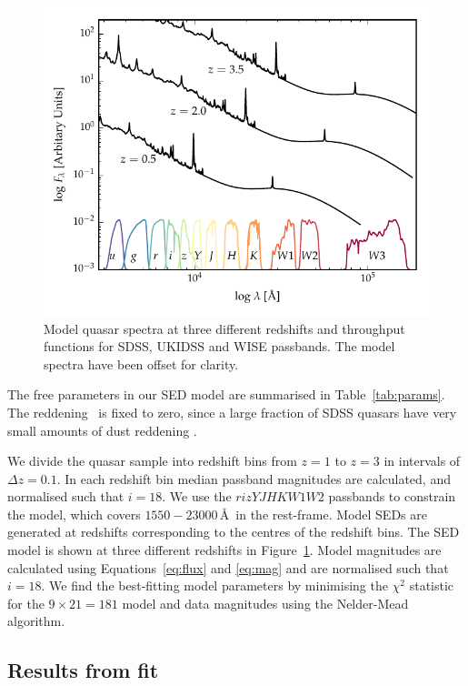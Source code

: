 \begin{figure}
  \centering
  \includegraphics[width=\textwidth]{figures/chapter05/throughput.pdf}
  \caption[{Model quasar spectrum at three different redshifts.}]{Model quasar spectra at three different redshifts and throughput functions for SDSS, UKIDSS and WISE passbands. The model spectra have been offset for clarity.}
  \label{fig:filters}
\end{figure}

The free parameters in our SED model are summarised in Table~\ref{tab:params}. 
The reddening \ebv\, is fixed to zero, since a large fraction of SDSS quasars have very small amounts of dust reddening \citep{richards03}. 

We divide the quasar sample into redshift bins from $z=1$ to $z=3$ in intervals of $\Delta z = 0.1$.
In each redshift bin median passband magnitudes are calculated, and normalised such that $i=18$.
We use the $rizYJHKW1W2$ passbands to constrain the model, which covers $1550-23000$\,\AA\, in the rest-frame. 
Model SEDs are generated at redshifts corresponding to the centres of the redshift bins.
The SED model is shown at three different redshifts in Figure~\ref{fig:filters}.
Model magnitudes are calculated using Equations~\ref{eq:flux} and \ref{eq:mag} and are normalised such that $i=18$.
We find the best-fitting model parameters by minimising the $\chi^2$ statistic for the $9 \times 21 = 181$ model and data magnitudes using the Nelder-Mead algorithm. 

\subsection{Results from fit}

